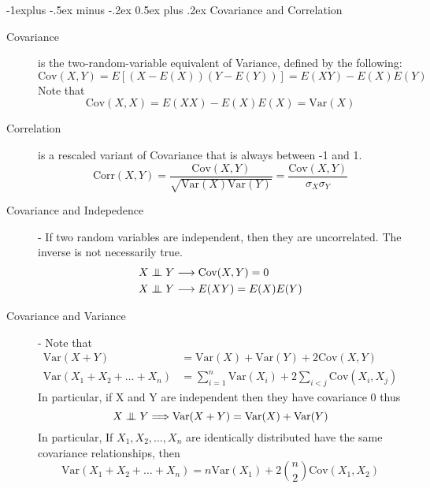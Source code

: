 \documentclass[10pt,landscape]{article}
\makeatletter
\newcommand\independent{\protect\mathpalette{\protect\independenT}{\perp}}
\def\independenT#1#2{\mathrel{\setbox0\hbox{$#1#2$}%
    \copy0\kern-\wd0\mkern4mu\box0}}
\newcommand{\var}{\textrm{Var}}
\newcommand{\cov}{\textrm{Cov}}
\newcommand{\corr}{\textrm{Corr}}
\renewcommand{\subsection}{\@startsection{subsection}{2}{0mm}%
                                {-1explus -.5ex minus -.2ex}%
                                {0.5ex plus .2ex}%
                                {\normalfont\normalsize\bfseries}}
\makeatother
\begin{document}
\begin{multicols}{3}
\subsection{Covariance and Correlation}
\begin{description}
\item [Covariance] is the two-random-variable equivalent of Variance, defined by the following:
    \[\cov(X, Y) = E[(X - E(X))(Y - E(Y))] = E(XY) - E(X)E(Y)\]
    Note that 
    \[\cov(X, X) = E(XX) - E(X)E(X) =  \var(X)\]
\item [Correlation] is a rescaled variant of Covariance that is always between -1 and 1.
    \[\corr(X, Y) = \frac{\cov(X, Y)}{\sqrt{\var(X)\var(Y)}} = \frac{\cov(X, Y)}{\sigma_X\sigma_Y}\]
\item [Covariance and Indepedence] - If two random variables are independent, then they are uncorrelated. The inverse is not necessarily true. 
    \begin{align*}
    	X \independent Y &\longrightarrow \cov(X, Y) = 0 \\
    	X \independent Y &\longrightarrow E(XY) = E(X)E(Y)
    \end{align*}
\item [Covariance and Variance] - Note that
    \begin{align*}
        \var(X + Y) &= \var(X) + \var(Y) + 2\cov(X, Y) \\
        \var(X_1 + X_2 + \dots + X_n ) &= \sum_{i = 1}^{n}\var(X_i) + 2\sum_{i < j} \cov(X_i, X_j)
    \end{align*}
    In particular, if X and Y are independent then they have covariance 0 thus
    \[X \independent Y \Longrightarrow \var(X + Y) = \var(X) + \var(Y)\]
    In particular, If $X_1, X_2, \dots, X_n$ are identically distributed have the same covariance relationships, then 
    \[\var(X_1 + X_2 + \dots + X_n ) = n\var(X_1) + 2{n \choose 2}\cov(X_1, X_2)\]
    

\end{description}
\end{multicols}
\end{document}
